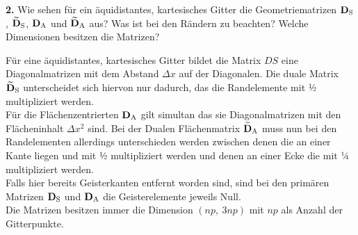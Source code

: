 \documentclass[Protokollheft.tex]{subfiles}
\begin{document}
\begin{framed}
	\noindent \textbf{2.} Wie sehen für ein äquidistantes, kartesisches Gitter die Geometriematrizen $\mathbf{D}_\text{S}$, $\mathbf{\widetilde{D}}_\text{S}$, $\mathbf{D}_\text{A}$ und $\mathbf{\widetilde{D}}_\text{A}$ aus? Was ist bei den Rändern zu beachten? Welche Dimensionen besitzen die Matrizen?\label{exer:geoMatsStructure}
\end{framed}
\noindent
Für eine äquidistantes, kartesisches Gitter bildet die Matrix $DS$ eine Diagonalmatrizen mit dem Abstand $\Delta x$ auf der Diagonalen. Die duale Matrix $\mathbf{\widetilde{D}}_\text{S}$ unterscheidet sich hiervon nur dadurch, das die Randelemente mit ½ multipliziert werden. \\
Für die Flächenzentrierten $\mathbf{D}_\text{A}$ gilt simultan das sie Diagonalmatrizen mit den Flächeninhalt $\Delta x^2$ sind. Bei der Dualen Flächenmatrix $\mathbf{\widetilde{D}}_\text{A}$ muss nun bei den Randelementen allerdings unterschieden werden zwischen denen die an einer Kante liegen und mit ½ multipliziert werden und denen an einer Ecke die mit ¼ multipliziert werden. \\
Falls hier bereits Geisterkanten entfernt worden sind, sind bei den primären Matrizen $\mathbf{D}_\text{S}$ und $\mathbf{D}_\text{A}$ die Geisterelemente jeweils Null. \\
\noindent
Die Matrizen besitzen immer die Dimension  $(np,\ 3np)$ mit $np$ als Anzahl der Gitterpunkte.
\end{document}
